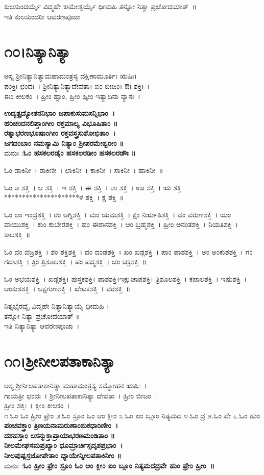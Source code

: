 ಕುಲಸುಂದರ್ಯೈ ವಿದ್ಮಹೇ ಕಾಮೇಶ್ವರ್ಯೈ ಧೀಮಹಿ ತನ್ನೋ ನಿತ್ಯಾ ಪ್ರಚೋದಯಾತ್~॥\\
ಇತಿ ಕುಲಸುಂದರೀ ಆವರಣಪೂಜಾ
\section{೧೦।ನಿತ್ಯಾನಿತ್ಯಾ}
ಅಸ್ಯ ಶ್ರೀನಿತ್ಯಾನಿತ್ಯಾಮಹಾಮಂತ್ರಸ್ಯ ದಕ್ಷಿಣಾಮೂರ್ತಿಃ ಋಷಿಃ।\\ ಪಂಕ್ತಿಃ ಛಂದಃ~। ಶ್ರೀನಿತ್ಯಾನಿತ್ಯಾದೇವತಾ। ಐಂ ಬೀಜಂ। ಔಃ ಶಕ್ತಿಃ~।\\ ಈಂ ಕೀಲಕಂ~। ಹ್ರೀಂ ಹ್ಸಾಂ, ಹ್ರೀಂ ಹ್ಸೀಂ ಇತ್ಯಾದಿನಾ ನ್ಯಾಸಃ~।

{\bfseries ಉದ್ಯತ್ಪ್ರದ್ಯೋತನನಿಭಾಂ ಜಪಾಕುಸುಮಸನ್ನಿಭಾಂ~।\\
ಹರಿಚಂದನಲಿಪ್ತಾಂಗೀಂ ರಕ್ತಮಾಲ್ಯ ವಿಭೂಷಿತಾಂ ॥\\
ರತ್ನಾಭರಣಭೂಷಾಂಗೀಂ ರಕ್ತವಸ್ತ್ರಸುಶೋಭಿತಾಂ~।\\
ಜಗದಂಬಾಂ ನಮಸ್ಯಾಮಿ ನಿತ್ಯಾಂ ಶ್ರೀಪರಮೇಶ್ವರೀಂ ॥\\}
ಮನುಃ :{\bfseries  ಓಂ ಹಸಕಲರಡೈಂ ಹಸಕಲರಡೀಂ ಹಸಕಲರಡೌಃ ॥}

ಓಂ ಡಾಕಿನೀ~।  ರಾಕಿಣೀ~।  ಲಾಕಿನೀ~।  ಕಾಕಿನೀ~।  ಸಾಕಿನೀ~।  ಹಾಕಿನೀ~॥ 

ಓಂ ಅ ಶಕ್ತಿ~।  ಆ ಶಕ್ತಿ~।  ಇ ಶಕ್ತಿ~।  ಈ ಶಕ್ತಿ~।  ಉ ಶಕ್ತಿ~।  ಊ ಶಕ್ತಿ~।  ಋ ಶಕ್ತಿ *********************ಳ ಶಕ್ತಿ~।  ಕ್ಷ ಶಕ್ತಿ~॥ 

ಓಂ ಲಂ ಇಂದ್ರಶಕ್ತಿ~।  ರಂ ಅಗ್ನಿಶಕ್ತಿ~।  ಮಂ ಯಮಶಕ್ತಿ~।  ಕ್ಷಂ ನಿರ್ಋತಿಶಕ್ತಿ~।  ವಂ ವರುಣಶಕ್ತಿ~।  ಯಂ ವಾಯುಶಕ್ತಿ~।  ಕುಂ ಕುಬೇರಶಕ್ತಿ~।  ಹಂ ಈಶಾನಶಕ್ತಿ~।  ಆಂ ಬ್ರಹ್ಮಶಕ್ತಿ~।  ಹ್ರೀಂ ಅನಂತಶಕ್ತಿ~।  ನಿಯತಿಶಕ್ತಿ~।  ಕಾಲಶಕ್ತಿ~॥ 

ಓಂ ವಂ ವಜ್ರಶಕ್ತಿ~।  ಶಂ ಶಕ್ತಿಶಕ್ತಿ~।  ದಂ ದಂಡಶಕ್ತಿ~।  ಖಂ ಖಡ್ಗಶಕ್ತಿ~।  ಪಾಂ ಪಾಶಶಕ್ತಿ~।  ಅಂ ಅಂಕುಶಶಕ್ತಿ~।  ಗಂ ಗದಾಶಕ್ತಿ~।  ತ್ರಿಂ ತ್ರಿಶೂಲಶಕ್ತಿ~।  ಪಂ ಪದ್ಮಶಕ್ತಿ~।  ಚಂ ಚಕ್ರಶಕ್ತಿ~॥ 

ಓಂ ಅಭಯಶಕ್ತಿ~।  ಖಡ್ಗಶಕ್ತಿ। ಪುಸ್ತಕಶಕ್ತಿ। ಪಾಶಶಕ್ತಿ।ಇಕ್ಷುಚಾಪಶಕ್ತಿ। ತ್ರಿಶೂಲಶಕ್ತಿ~।  ಕಪಾಲಶಕ್ತಿ~।  ಇಷುಶಕ್ತಿ~।  ಅಂಕುಶಶಕ್ತಿ~।  ಅಕ್ಷಗುಣಶಕ್ತಿ~।  ಖೇಟಕಶಕ್ತಿ~।  ವರಶಕ್ತಿ~॥

ನಿತ್ಯಭೈರವ್ಯೈ ವಿದ್ಮಹೇ ನಿತ್ಯಾನಿತ್ಯಾಯೈ ಧೀಮಹಿ ।\\ತನ್ನೋ ನಿತ್ಯಾ ಪ್ರಚೋದಯಾತ್ ॥\\
ಇತಿ ನಿತ್ಯಾನಿತ್ಯಾ ಆವರಣಪೂಜಾ~।
\section{೧೧।ಶ್ರೀನೀಲಪತಾಕಾನಿತ್ಯಾ}
ಅಸ್ಯ ಶ್ರೀನೀಲಪತಾಕಾನಿತ್ಯಾ ಮಹಾಮಂತ್ರಸ್ಯ ಸಮ್ಮೋಹನ ಋಷಿಃ~। \\ಗಾಯತ್ರೀ ಛಂದಃ~। ಶ್ರೀನೀಲಪತಾಕಾನಿತ್ಯಾ ದೇವತಾ~। ಹ್ರೀಂ ಬೀಜಂ~।\\ ಹ್ರೀಂ ಶಕ್ತಿಃ~। ಕ್ಲೀಂ ಕೀಲಕಂ~।\\
೧.ಓಂ ಓಂ ಹ್ರೀಂ ಫ್ರೇಂ ೨.ಓಂ ಸ್ರೂಂ ಓಂ ಆಂ ಕ್ಲೀಂ ೩.ಓಂ ಐಂ ಬ್ಲೂಂ ನಿತ್ಯಮದ ೪.ಓಂ ದ್ರ ೫.ಓಂ ವೇ ೬.ಓಂ ಹುಂ \\
{\bfseries ಪಂಚವಕ್ತ್ರಾಂ ತ್ರಿಣಯನಾಮರುಣಾಂಶುಕಧಾರಿಣೀಂ~।\\
ದಶಹಸ್ತಾಂ ಲಸನ್ಮುಕ್ತಾಪ್ರಾಯಾಭರಣಮಂಡಿತಾಂ ॥\\
ನೀಲಮೇಘಸಮಪ್ರಖ್ಯಾಂ ಧೂಮ್ರಾರ್ಚಿಸ್ಸದೃಶಪ್ರಭಾಂ~।\\
ನೀಲಪುಷ್ಪಸ್ರಜೋಪೇತಾಂ ಧ್ಯಾಯೇನ್ನೀಲಪತಾಕಿನೀಂ ॥\\}
ಮನುಃ :{\bfseries ಓಂ ಹ್ರೀಂ ಫ್ರೇಂ ಸ್ರೂಂ ಓಂ ಆಂ ಕ್ಲೀಂ ಐಂ ಬ್ಲೂಂ ನಿತ್ಯಮದದ್ರವೇ ಹುಂ ಫ್ರೇಂ ಹ್ರೀಂ~॥}

